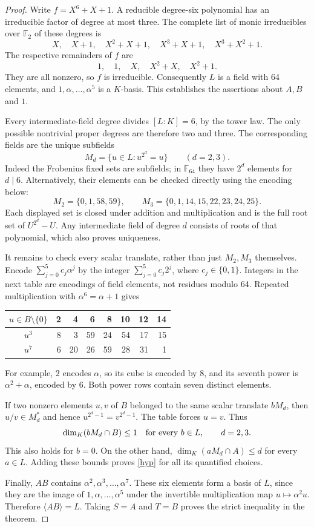 \documentclass[11pt]{article}
\newcommand{\F}{\mathbb F}
\begin{document}
\begin{proof}
Write $f=X^6+X+1$. A reducible degree-six polynomial has an irreducible
factor of degree at most three. The complete list of monic irreducibles
over $\F_2$ of these degrees is
\[
 X,\quad X+1,\quad X^2+X+1,\quad X^3+X+1,\quad X^3+X^2+1.
\]
The respective remainders of $f$ are
\[
 1,\quad 1,\quad X,\quad X^2+X,\quad X^2+1.
\]
They are all nonzero, so $f$ is irreducible. Consequently $L$ is a
field with 64 elements, and $1,\alpha,\ldots,\alpha^5$ is a $K$-basis.
This establishes the assertions about $A,B$ and $1$.

Every intermediate-field degree divides $[L:K]=6$, by the tower law.
The only possible nontrivial proper degrees are therefore two and three.
The corresponding fields are the unique subfields
\[
 M_d=\{u\in L:u^{2^d}=u\}\qquad(d=2,3).
\]
Indeed the Frobenius fixed sets are subfields; in $\F_{64}$ they have
$2^d$ elements for $d\mid6$. Alternatively, their elements can be
checked directly using the encoding below:
\[
 M_2=\{0,1,58,59\},\qquad
 M_3=\{0,1,14,15,22,23,24,25\}.
\]
Each displayed set is closed under addition and multiplication and is
the full root set of $U^{2^d}-U$. Any intermediate field of degree $d$
consists of roots of that polynomial, which also proves uniqueness.

It remains to check every scalar translate, rather than just $M_2,M_3$
themselves. Encode $\sum_{j=0}^5 c_j\alpha^j$ by the integer
$\sum_{j=0}^5 c_j2^j$, where $c_j\in\{0,1\}$. Integers in the next
table are encodings of field elements, not residues modulo 64.
Repeated multiplication with $\alpha^6=\alpha+1$ gives
\begin{center}
\begin{tabular}{c|rrrrrrr}
\toprule
$u\in B\setminus\{0\}$ &2&4&6&8&10&12&14\\
\midrule
$u^3$ &8&3&59&24&54&17&15\\
$u^7$ &6&20&26&59&28&31&1\\
\bottomrule
\end{tabular}
\end{center}
For example, $2$ encodes $\alpha$, so its cube is encoded by $8$, and
its seventh power is $\alpha^2+\alpha$, encoded by $6$.
Both power rows contain seven distinct elements.

If two nonzero elements $u,v$ of $B$ belonged to the same scalar
translate $bM_d$, then $u/v\in M_d^*$ and hence
$u^{2^d-1}=v^{2^d-1}$. The table forces $u=v$. Thus
\[
 \dim_K(bM_d\cap B)\le1\quad\hbox{for every }b\in L,
 \qquad d=2,3.
\]
This also holds for $b=0$. On the other hand,
$\dim_K(aM_d\cap A)\le d$ for every $a\in L$. Adding these bounds
proves \eqref{hyp} for all its quantified choices.

Finally, $AB$ contains $\alpha^2,\alpha^3,\ldots,\alpha^7$.
These six elements form a basis of $L$, since they are the image of
$1,\alpha,\ldots,\alpha^5$ under the invertible multiplication map
$u\mapsto\alpha^2u$. Therefore $\langle AB\rangle=L$.
Taking $S=A$ and $T=B$ proves the strict inequality in the theorem.
\end{proof}
\end{document}
